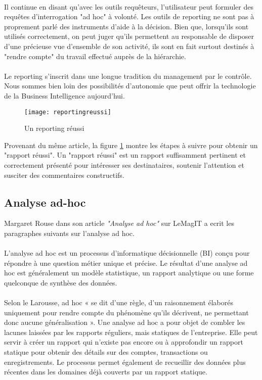 \paragraph{}
Il continue en disant qu'avec les outils requêteurs, l'utilisateur peut formuler des requêtes d'interrogation "ad hoc" à volonté. Les outils de reporting ne sont pas à proprement parlé des instruments d'aide à la décision. Bien que, lorsqu'ils sont utilisés correctement, on peut juger qu'ils permettent au responsable de disposer d'une précieuse vue d'ensemble de son activité, ils sont en fait surtout destinés à "rendre compte" du travail effectué auprès de la hiérarchie. 
\paragraph{}
Le reporting s'inscrit dans une longue tradition du management par le contrôle. Nous sommes bien loin des possibilités d'autonomie que peut offrir la technologie de la Business Intelligence aujourd'hui.

\begin{figure}[H]
    \centering
    \texttt{[image: reportingreussi]}
    \caption{Un reporting réussi}
    \label{fig:reportingreussi}
\end{figure}

Provenant du même article, la figure \ref{fig:reportingreussi} montre les étapes à suivre pour obtenir un "rapport réussi". Un "rapport réussi" est un rapport suffisamment pertinent et correctement présenté pour intéresser ses destinataires, soutenir l'attention et susciter des commentaires constructifs.

\subsection{Analyse ad-hoc}
Margaret Rouse dans son article \textit{"Analyse ad hoc"} sur LeMagIT \cite{WEBSITE:5} a ecrit les paragraphes suivants sur l'analyse ad hoc.
\paragraph{}
L'analyse ad hoc est un processus d'informatique décisionnelle (BI) conçu pour répondre à une question métier unique et précise. Le résultat d'une analyse ad hoc est généralement un modèle statistique, un rapport analytique ou une forme quelconque de synthèse des données. 
\paragraph{}
Selon le Larousse, ad hoc « se dit d'une règle, d'un raisonnement élaborés uniquement pour rendre compte du phénomène qu'ils décrivent, ne permettant donc aucune généralisation ». Une analyse ad hoc a pour objet de combler les lacunes laissées par les rapports réguliers, mais statiques de l'entreprise. Elle peut servir à créer un rapport qui n'existe pas encore ou à approfondir un rapport statique pour obtenir des détails sur des comptes, transactions ou enregistrements. Le processus permet également de recueillir des données plus récentes dans les domaines déjà couverts par un rapport statique.
